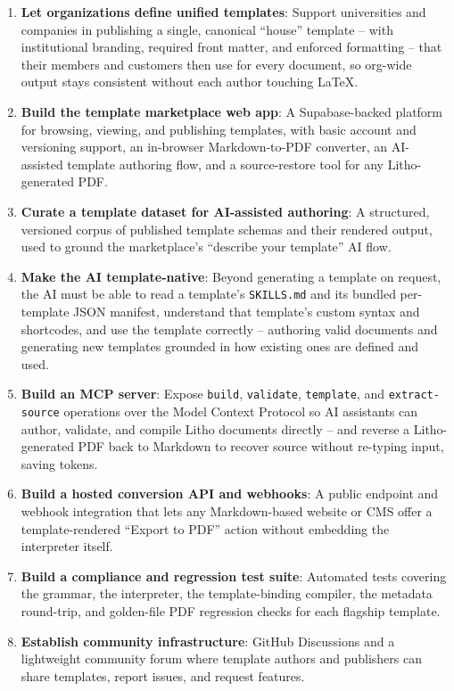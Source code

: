 \documentclass[a4paper,twoside]{article}
\begin{document}
\begin{enumerate}
  \item \textbf{Let organizations define unified templates}: Support universities and companies in publishing a single, canonical ``house'' template -- with institutional branding, required front matter, and enforced formatting -- that their members and customers then use for every document, so org-wide output stays consistent without each author touching LaTeX.
  \item \textbf{Build the template marketplace web app}: A Supabase-backed platform for browsing, viewing, and publishing templates, with basic account and versioning support, an in-browser Markdown-to-PDF converter, an AI-assisted template authoring flow, and a source-restore tool for any Litho-generated PDF.
  \item \textbf{Curate a template dataset for AI-assisted authoring}: A structured, versioned corpus of published template schemas and their rendered output, used to ground the marketplace's ``describe your template'' AI flow.
  \item \textbf{Make the AI template-native}: Beyond generating a template on request, the AI must be able to read a template's \texttt{SKILLS.md} and its bundled per-template JSON manifest, understand that template's custom syntax and shortcodes, and use the template correctly -- authoring valid documents and generating new templates grounded in how existing ones are defined and used.
  \item \textbf{Build an MCP server}: Expose \texttt{build}, \texttt{validate}, \texttt{template}, and \texttt{extract-source} operations over the Model Context Protocol so AI assistants can author, validate, and compile Litho documents directly -- and reverse a Litho-generated PDF back to Markdown to recover source without re-typing input, saving tokens.
  \item \textbf{Build a hosted conversion API and webhooks}: A public endpoint and webhook integration that lets any Markdown-based website or CMS offer a template-rendered ``Export to PDF'' action without embedding the interpreter itself.
  \item \textbf{Build a compliance and regression test suite}: Automated tests covering the grammar, the interpreter, the template-binding compiler, the metadata round-trip, and golden-file PDF regression checks for each flagship template.
  \item \textbf{Establish community infrastructure}: GitHub Discussions and a lightweight community forum where template authors and publishers can share templates, report issues, and request features.
\end{enumerate}
\end{document}
